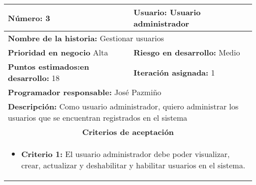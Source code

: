 \begin{longtable}{|p{6.7cm}|p{6.7cm}|}
    \textbf{Número:} 3                                   & \textbf{Usuario:} Usuario administrador                                                              \\
    \hline
    \multicolumn{2}{|l|}{\textbf{Nombre de la historia:} Gestionar usuarios}                                                                                    \\
    \hline
    \textbf{Prioridad en negocio}  Alta                  & \textbf{Riesgo en desarrollo:} Medio                                                                 \\
    \hline
    \textbf{\textbf{Puntos estimados:}en desarrollo:} 18 & \textbf{Iteración asignada:} 1                                                                       \\
    \hline
    \multicolumn{2}{|l|}{\textbf{Programador responsable:} José Pazmiño }                                                                                       \\
    \hline
    \multicolumn{2}{|p{13.4cm}|}{\textbf{Descripción:} Como usuario administrador, quiero administrar los usuarios que se encuentran registrados en el sistema} \\
    \hline
    \multicolumn{2}{|c|}{\textbf{Criterios de aceptación}}                                                                                                      \\
    \hline
    \multicolumn{2}{|p{13.4cm}|}{
    \begin{itemize}[label={},leftmargin=*, nosep]
        \item \textbf{Criterio 1:} El usuario administrador debe poder visualizar, crear, actualizar y deshabilitar y habilitar usuarios en el sistema.
    \end{itemize}
    }                                                                                                                                                           \\
\end{longtable}



